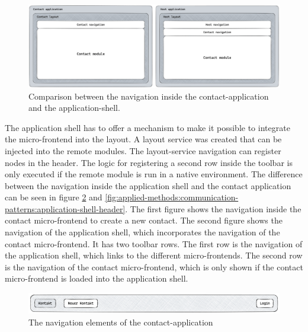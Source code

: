 \ifshowImages
  \begin{figure}[H]
  \centering
  \includegraphics[width=1\linewidth]{images/applied-methods/communication-patterns/layout-comparison.jpg}
  \caption{Comparison between the navigation inside the contact-application and the application-shell.}\label{fig:applied-methods:communication-patterns:comparison-between-host-and-contact-layout}
  \end{figure}
\fi

\noindent The application shell has to offer a mechanism to make it possible to integrate the micro-frontend into the layout. A layout service was created that can be injected into the remote modules. The layout-service navigation can register nodes in the header. The logic for registering a second row inside the toolbar is only executed if the remote module is run in a native environment. The difference between the navigation inside the application shell and the contact application can be seen in figure \ref{fig:applied-methods:communication-patterns:contact-application-header} and \ref{fig:applied-methods:communication-patterns:application-shell-header}. The first figure shows the navigation inside the contact micro-frontend to create a new contact. The second figure shows the navigation of the application shell, which incorporates the navigation of the contact micro-frontend. It has two toolbar rows. The first row is the navigation of the application shell, which links to the different micro-frontends. The second row is the navigation of the contact micro-frontend, which is only shown if the contact micro-frontend is loaded into the application shell.

\ifshowImages
  \begin{figure}[H]
  \centering
  \includegraphics[width=1\linewidth]{images/applied-methods/communication-patterns/contact-header.png}
  \caption{The navigation elements of the contact-application}\label{fig:applied-methods:communication-patterns:contact-application-header}
  \end{figure}
\fi

